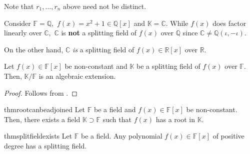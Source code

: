 Note that $r_1, \ldots, r_n$ above need not be distinct.

\begin{ex}
    Consider $\mathbb{F} = \mathbb{Q},$ $f(x) = x^2 + 1 \in \mathbb{Q}[x]$ and $\mathbb{K} = \mathbb{C}.$ While $f(x)$ does factor linearly over $\mathbb{C},$ $\mathbb{C}$ is \textbf{not} a splitting field of $f(x)$ over $\mathbb{Q}$ since $\mathbb{C} \neq \mathbb{Q}(\iota, -\iota).$

    On the other hand, $\mathbb{C}$ \emph{is} a splitting field of $f(x) \in \mathbb{R}[x]$ over $\mathbb{R}.$
\end{ex}

\begin{cor}
    Let $f(x) \in \mathbb{F}[x]$ be non-constant and $\mathbb{K}$ be a splitting field of $f(x)$ over $\mathbb{F}.$ Then, $\mathbb{K}/\mathbb{F}$ is an algebraic extension.
\end{cor}
\begin{proof} 
    Follows from .
\end{proof}

\begin{restatable}[]{thm}{rootcanbeadjoined}
\label{thm:rootcanbeadjoined}
    Let $\mathbb{F}$ be a field and $f(x) \in \mathbb{F}[x]$ be non-constant. Then, there exists a field $\mathbb{K} \supset \mathbb{F}$ such that $f(x)$ has a root in $\mathbb{K}.$ \hfill\hyperref[thm:rootcanbeadjoined2]{\downsym}
\end{restatable}

\begin{restatable}{thm}{splitfieldexists}
\label{thm:splitfieldexists}
    Let $\mathbb{F}$ be a field. Any polynomial $f(x) \in \mathbb{F}[x]$ of positive degree has a splitting field. \hfill\hyperref[thm:splitfieldexists2]{\downsym}
\end{restatable}